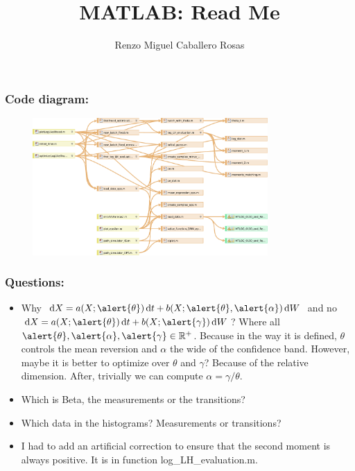 \documentclass[aspectratio=169]{beamer}\usepackage[utf8]{inputenc}
\title{MATLAB: Read Me}
\subtitle{Renzo Miguel Caballero Rosas}
\newcommand{\R}{\mathbb{R}}
\begin{document}

\begin{frame}
\titlepage
\end{frame}


\begin{frame}\frametitle{Code diagram:}

\begin{figure}[ht!]
\centering
\includegraphics[width=0.8\textwidth]{../Results/project/20200320_MATLAB_Files_Graph.pdf}
\end{figure}

\end{frame}


\begin{frame}\frametitle{Questions:}

\begin{itemize}

\item Why $\dif X=a(X;\alert{\theta})\dif t+b(X;\alert{\theta},\alert{\alpha})\dif W$ and no $\dif X=a(X;\alert{\theta})\dif t+b(X;\alert{\gamma})\dif W$? Where all $\alert{\theta},\alert{\alpha},\alert{\gamma}\in\R^+$. {\color{green}Because in the way it is defined, $\theta$ controls the mean reversion and $\alpha$ the wide of the confidence band.} {\color{red} However, maybe it is better to optimize over $\theta$ and $\gamma$? Because of the relative dimension. After, trivially we can compute $\alpha=\gamma/\theta$}.

\item Which is Beta, the measurements or the transitions? 

\item Which data in the histograms? Measurements or transitions? 

\item I had to add an artificial correction to ensure that the second moment is always positive. It is in function log\_LH\_evaluation.m.

\end{itemize}

\end{frame}
\end{document}
